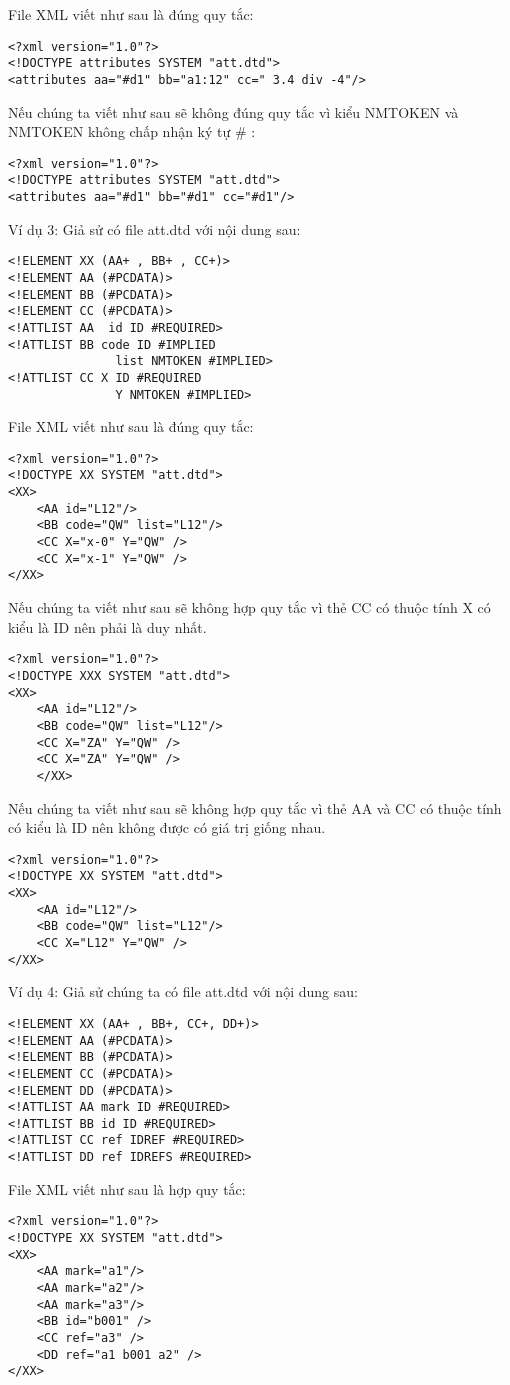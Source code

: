 File XML viết như sau là đúng quy tắc:
\begin{lstlisting}
<?xml version="1.0"?>
<!DOCTYPE attributes SYSTEM "att.dtd">
<attributes aa="#d1" bb="a1:12" cc=" 3.4 div -4"/>
\end{lstlisting}

Nếu chúng ta viết như sau sẽ không đúng quy tắc vì kiểu NMTOKEN và NMTOKEN không chấp nhận ký tự \# :   
\begin{lstlisting}
<?xml version="1.0"?>
<!DOCTYPE attributes SYSTEM "att.dtd">
<attributes aa="#d1" bb="#d1" cc="#d1"/>
\end{lstlisting}

Ví dụ 3: Giả sử có file att.dtd với nội dung sau:
\begin{lstlisting}
<!ELEMENT XX (AA+ , BB+ , CC+)>
<!ELEMENT AA (#PCDATA)>
<!ELEMENT BB (#PCDATA)>
<!ELEMENT CC (#PCDATA)>
<!ATTLIST AA  id ID #REQUIRED>
<!ATTLIST BB code ID #IMPLIED 
               list NMTOKEN #IMPLIED>
<!ATTLIST CC X ID #REQUIRED
               Y NMTOKEN #IMPLIED>
\end{lstlisting}
         
File XML viết như sau là đúng quy tắc:
\begin{lstlisting}
<?xml version="1.0"?>
<!DOCTYPE XX SYSTEM "att.dtd">
<XX>
	<AA id="L12"/>
	<BB code="QW" list="L12"/>
	<CC X="x-0" Y="QW" />
	<CC X="x-1" Y="QW" />
</XX>
\end{lstlisting}

Nếu chúng ta viết như sau sẽ không hợp quy tắc vì thẻ  {\ttfamily  CC} có thuộc tính {\ttfamily  X} có kiểu là {\ttfamily ID} nên phải là duy nhất.
\begin{lstlisting}
<?xml version="1.0"?>
<!DOCTYPE XXX SYSTEM "att.dtd">
<XX>
	<AA id="L12"/>
	<BB code="QW" list="L12"/>
	<CC X="ZA" Y="QW" />
	<CC X="ZA" Y="QW" />
	</XX>
\end{lstlisting}

Nếu chúng ta viết như sau sẽ không hợp quy tắc vì thẻ {\ttfamily  AA} và {\ttfamily CC} có thuộc tính có kiểu là {\ttfamily ID} nên không được có giá trị giống nhau.
\begin{lstlisting}
<?xml version="1.0"?>
<!DOCTYPE XX SYSTEM "att.dtd">
<XX>
	<AA id="L12"/>
	<BB code="QW" list="L12"/>
	<CC X="L12" Y="QW" />
</XX>
\end{lstlisting}

Ví dụ 4: Giả sử chúng ta có file att.dtd với nội dung sau:
\begin{lstlisting}
<!ELEMENT XX (AA+ , BB+, CC+, DD+)>
<!ELEMENT AA (#PCDATA)>
<!ELEMENT BB (#PCDATA)>
<!ELEMENT CC (#PCDATA)>
<!ELEMENT DD (#PCDATA)>
<!ATTLIST AA mark ID #REQUIRED>
<!ATTLIST BB id ID #REQUIRED>      
<!ATTLIST CC ref IDREF #REQUIRED>
<!ATTLIST DD ref IDREFS #REQUIRED>
\end{lstlisting}
File XML viết như sau là hợp quy tắc:
\begin{lstlisting}
<?xml version="1.0"?>
<!DOCTYPE XX SYSTEM "att.dtd">
<XX>
	<AA mark="a1"/>
	<AA mark="a2"/>
	<AA mark="a3"/>
	<BB id="b001" />
	<CC ref="a3" />
	<DD ref="a1 b001 a2" />
</XX>
\end{lstlisting}

